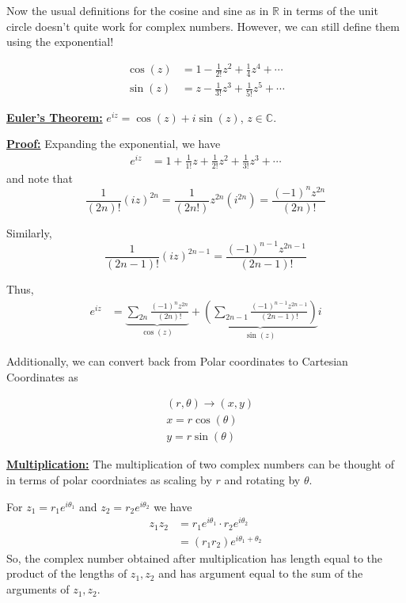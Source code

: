 \documentclass{article}
\newcommand{\R}{\mathbb{R}}
\newcommand{\C}{\mathbb{C}}
\begin{document}
\vskip 0.5cm
Now the usual definitions for the cosine and sine as in $\R$ in terms of the unit circle doesn't quite work for complex numbers. However, we can still define them using the exponential!

\begin{align*}
  \cos(z) &= 1 - \frac{1}{2!}z^2 + \frac{1}{4}z^4 + \cdots\\
  \sin(z) &= z - \frac{1}{3!}z^3 + \frac{1}{5!}z^5 + \cdots
\end{align*}

\vskip 0.5cm
\begin{mathdefinitionbox}{}
  \underline{\textbf{Euler's Theorem:}} $e^{iz} = \cos(z) + i\sin(z)$, $z \in \C$.

\vskip 0.5cm
\underline{\textbf{Proof:}} 
Expanding the exponential, we have
\begin{align*}
  e^{iz} &= 1 + \frac{1}{1!} z + \frac{1}{2!} z^2 + \frac{1}{3!} z^3 + \cdots 
\end{align*}
and note that 
\[ \frac{1}{(2n)!} (iz)^{2n} = \frac{1}{(2n!)} z^{2n} (i^{2n}) = \frac{(-1)^n z^{2n}}{(2n)!} \]

\vskip 0.5cm
Similarly,
\[ \frac{1}{(2n-1)!} (iz)^{2n-1} = \frac{(-1)^{n-1} z^{2n-1}}{(2n-1)!} \]

\vskip 0.5cm
Thus,
\begin{align*}
  e^{iz} &= \underbrace{\sum_{2n} \frac{(-1)^n z^{2n}}{(2n)!}}_{\cos(z)} + \underbrace{\left( \sum_{2n-1} \frac{(-1)^{n-1} z^{2n-1}}{(2n-1)!} \right)}_{\sin(z)} i
\end{align*}
\end{mathdefinitionbox}

\vskip 0.5cm
Additionally, we can convert back from Polar coordinates to Cartesian Coordinates as 

\begin{align*}
  &(r, \theta) \rightarrow (x, y) \\ 
  &x =r\cos(\theta) \\ 
  &y =r\sin(\theta)  
\end{align*}

\vskip 0.5cm
\underline{\textbf{Multiplication:}}
The multiplication of two complex numbers can be thought of in terms of polar coordniates as scaling by $r$ and rotating by $\theta$.

\vskip 0.25cm
For $z_1 = r_1e^{i\theta_1}$ and $z_2 = r_2e^{i\theta_2}$ we have 
\begin{align*}
  z_1 z_2 &= r_1e^{i\theta_1} \cdot r_2e^{i\theta_2} \\
  &= \left(r_1 r_2\right) e^{i\theta_1 + \theta_2}
\end{align*}
So, the complex number obtained after multiplication has length equal to the product of the lengths of $z_1, z_2$ and has argument equal to the sum of the arguments of $z_1, z_2$.
\end{document}
